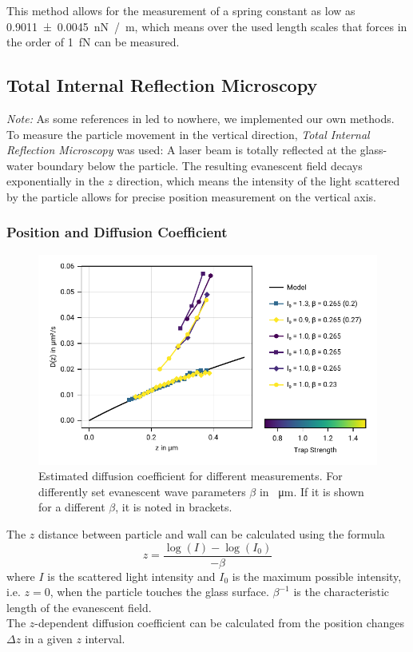 \documentclass[
    twoside=false,
    twocolumn=true,
    fontsize=11pt,
]{scrarticle}
\begin{document}
This method allows for the measurement of a spring constant as low as \SI{0.9011(45)}{\nano N /m}, which means over the used length scales that forces in the order of \SI{1}{\femto N} can be measured.

\subsection{Total Internal Reflection Microscopy}
\textit{Note:} As some references in \cite{instructions} led to nowhere, we implemented our own methods.\\
To measure the particle movement in the vertical direction, \textit{Total Internal Reflection Microscopy} was used: A laser beam is totally reflected at the glass-water boundary below the particle. The resulting evanescent field decays exponentially in the $z$ direction, which means the intensity of the light scattered by the particle allows for precise position measurement on the vertical axis.


\subsubsection*{Position and Diffusion Coefficient}
\begin{figure}
    \centering
    \includegraphics{figures/02_04_01_diffusion.pdf}
    \caption{Estimated diffusion coefficient for different measurements. For differently set evanescent wave parameters $\beta$ in \SI{}{\micro m}. If it is shown for a different $\beta$, it is noted in brackets.}
\end{figure}

The $z$ distance between particle and wall can be calculated using the formula \cite{instructions}
\begin{equation}
 \label{eq:calculate_z}
 z = \frac{\log(I) - \log(I_0)}{-\beta}
\end{equation}
where $I$ is the scattered light intensity and $I_0$ is the maximum possible intensity, i.e. $z=0$, when the particle touches the glass surface. $\beta^{-1}$ is the characteristic length of the evanescent field.\\
The $z$-dependent diffusion coefficient can be calculated from the position changes $\Delta z$ in a given $z$ interval.
\end{document}
